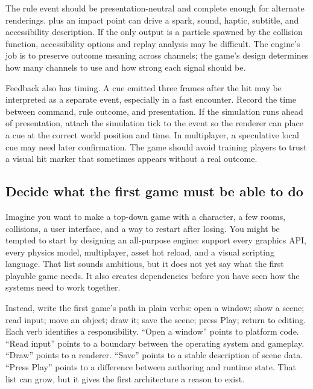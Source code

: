 The rule event should be presentation-neutral and complete enough for alternate renderings.  plus an impact point can drive a spark, sound, haptic, subtitle, and accessibility description. If the only output is a particle spawned by the collision function, accessibility options and replay analysis may be difficult. The engine's job is to preserve outcome meaning across channels; the game's design determines how many channels to use and how strong each signal should be.

Feedback also has timing. A cue emitted three frames after the hit may be interpreted as a separate event, especially in a fast encounter. Record the time between command, rule outcome, and presentation. If the simulation runs ahead of presentation, attach the simulation tick to the event so the renderer can place a cue at the correct world position and time. In multiplayer, a speculative local cue may need later confirmation. The game should avoid training players to trust a visual hit marker that sometimes appears without a real outcome.

\subsection{Decide what the first game must be able to do}\label{05-engine-i-ch009-decide-what-the-first-game-must-be-able-to-do}

\hypertarget{05-engine-i-ch009-decide-what-the-first-game-must-be-able-to-do}{}

Imagine you want to make a top-down game with a character, a few rooms, collisions, a user interface, and a way to restart after losing. You might be tempted to start by designing an all-purpose engine: support every graphics API, every physics model, multiplayer, asset hot reload, and a visual scripting language. That list sounds ambitious, but it does not yet say what the first playable game needs. It also creates dependencies before you have seen how the systems need to work together.

Instead, write the first game's path in plain verbs: open a window; show a scene; read input; move an object; draw it; save the scene; press Play; return to editing. Each verb identifies a responsibility. ``Open a window'' points to platform code. ``Read input'' points to a boundary between the operating system and gameplay. ``Draw'' points to a renderer. ``Save'' points to a stable description of scene data. ``Press Play'' points to a difference between authoring and runtime state. That list can grow, but it gives the first architecture a reason to exist.

